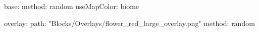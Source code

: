base:
  method: random
  useMapColor: biome
  
overlay:
  path: "Blocks/Overlays/flower_red_large_overlay.png"
  method: random